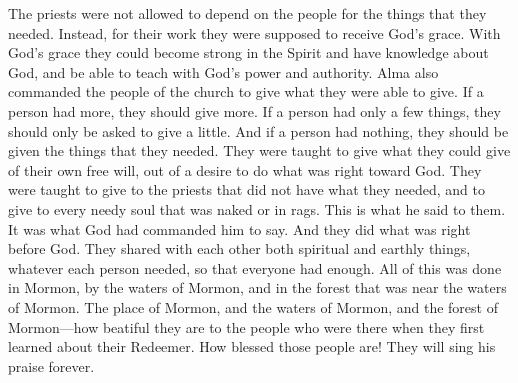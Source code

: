 The priests were not allowed to depend on the people for the things that they needed. Instead, for their work they were supposed to receive God's grace. With God's grace they could become strong in the Spirit and have knowledge about God, and be able to teach with God's power and authority.
\bverse \iffalse And again Alma commanded that the people of the church should impart of their substance, every one according to that which he had; if he have more abundantly he should impart more abundantly; and of him that had but little, but little should be required; and to him that had not should be given. \fi
Alma also commanded the people of the church to give what they were able to give. If a person had more, they should give more. If a person had only a few things, they should only be asked to give a little. And if a person had nothing, they should be given the things that they needed.
\bverse \iffalse And thus they should impart of their substance of their own free will and good desires towards God, and to those priests that stood in need, yea, and to every needy, naked soul. \fi
They were taught to give what they could give of their own free will, out of a desire to do what was right toward God. They were taught to give to the priests that did not have what they needed, and to give to every needy soul that was naked or in rags.
\bverse \iffalse And this he said unto them, having been commanded of God; and they did walk uprightly before God, imparting to one another both temporally and spiritually according to their needs and their wants. \fi
This is what he said to them. It was what God had commanded him to say. And they did what was right before God. They shared with each other both spiritual and earthly things, whatever each person needed, so that everyone had enough.
\bverse \iffalse And now it came to pass that all this was done in Mormon, yea, by the waters of Mormon, in the forest that was near the waters of Mormon; yea, the place of Mormon, the waters of Mormon, the forest of Mormon, how beautiful are they to the eyes of them who there came to the knowledge of their Redeemer; yea, and how blessed are they, for they shall sing to his praise forever. \fi
All of this was done in Mormon, by the waters of Mormon, and in the forest that was near the waters of Mormon. The place of Mormon, and the waters of Mormon, and the forest of Mormon---how beatiful they are to the people who were there when they first learned about their Redeemer. How blessed those people are! They will sing his praise forever.
